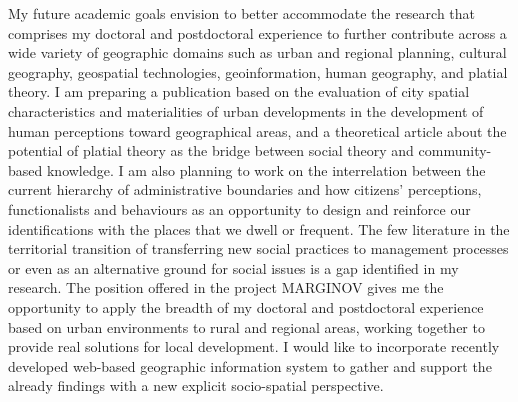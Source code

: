 My future academic goals envision to better accommodate the research that comprises my doctoral and postdoctoral experience to further contribute across a wide variety of geographic domains such as urban and regional planning, cultural geography, geospatial technologies, geoinformation, human geography, and platial theory. I am preparing a publication based on the evaluation of city spatial characteristics and materialities of urban developments in the development of human perceptions toward geographical areas, and a theoretical article about the potential of platial theory as the bridge between social theory and community-based knowledge. I am also planning to work on the interrelation between the current hierarchy of administrative boundaries and how citizens' perceptions, functionalists and behaviours as an opportunity to design and reinforce our identifications with the places that we dwell or frequent. The few literature in the territorial transition of transferring new social practices to management processes or even as an alternative ground for social issues is a gap identified in my research. The position offered in the project MARGINOV gives me the opportunity to apply the breadth of my doctoral and postdoctoral experience based on urban environments to rural and regional areas, working together to provide real solutions for local development. I would like to incorporate recently developed web-based geographic information system to gather and support the already findings with a new explicit socio-spatial perspective.\par

\begin{comment}


My expertise in Geographic Information Science (GIScience), planning, and social theory allow me to teach courses in digital geographies, qualitative and quantitative methods, and GIS, as well as fundamentals in programming language such as SQL and Python. Mixing methods and making associations between cutting-edge tools and theoretical frameworks, my classrooms shift between pragmatic and theoretical perspectives to be able to keep simple and complex overviews needed for the geographical inquiry. Furthermore, I have experience supervising students, helping them to reach their maximum potential by inspiring guiding them through an independent research project.\par

\end{comment}

